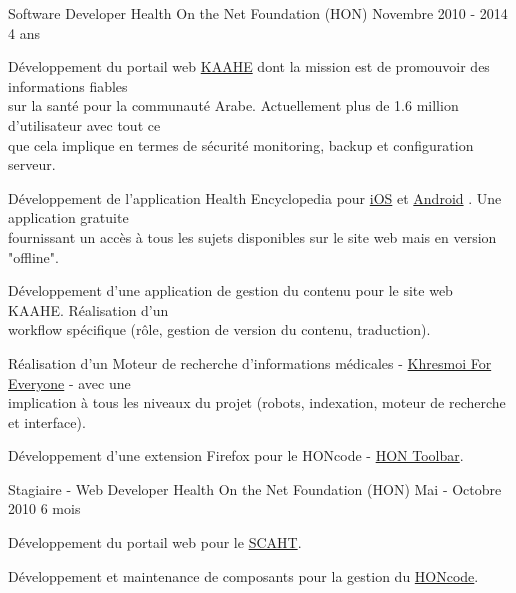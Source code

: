\begin{cventries}
  \cventry
    {Software Developer}
    {Health On the Net Foundation (HON)}
    {Novembre 2010 - 2014}
    {4 ans}
    {
      \begin{cvitems}
        \item{Développement du portail web
          {\color{awesome-skyblue}\href{http://www.kaahe.org/}{KAAHE}}
          dont la mission est de promouvoir des informations fiables \\
          sur la santé pour la communauté Arabe. Actuellement plus de 1.6
          million d'utilisateur avec tout ce \\que cela implique en termes de
          sécurité monitoring, backup et configuration serveur.
        }
        \item{Développement de l'application Health Encyclopedia pour
          {\color{awesome-skyblue}
            \href{https://itunes.apple.com/us/app/almwsw-t-alshyt/id624559765?l=fr&ls=1&mt=8}{iOS}}
          et
          {\color{awesome-skyblue}
            \href{https://play.google.com/store/apps/details?id=org.kaahe.kaaheApp&hl=en}{Android}}
          . Une application gratuite \\fournissant un accès à tous les sujets
          disponibles sur le site web mais en version "offline".
        }
        \item{Développement d'une application de gestion du contenu pour le
          site web KAAHE. Réalisation d'un \\workflow spécifique (rôle, gestion
          de version du contenu, traduction).
        }
        \item{Réalisation d'un Moteur de recherche d'informations médicales -
          {\color{awesome-skyblue}
            \href{http://everyone.khresmoi.eu/}{Khresmoi For Everyone}}
            - avec une \\implication à tous les niveaux du projet (robots,
            indexation, moteur de recherche et interface).
        }
        \item{Développement d'une extension Firefox pour le HONcode -
          {\color{awesome-skyblue}
          \href{https://addons.mozilla.org/en-US/firefox/addon/hon-toolbar/}{HON Toolbar}}.
        }
      \end{cvitems}
    }

  \cventry
    {Stagiaire - Web Developer}
    {Health On the Net Foundation (HON)}
    {Mai - Octobre 2010}
    {6 mois}
    {
      \begin{cvitems}
        \item{Développement du portail web pour le
          {\color{awesome-skyblue}\href{http://scaht.org/}{SCAHT}}.
        }
        \item{Développement et maintenance de composants pour la gestion du
          {\color{awesome-skyblue}
            \href{http://www.hon.ch/HONcode/Pro/Visitor/visitor.html}{HONcode}}.
        }
      \end{cvitems}
    }


\end{cventries}
